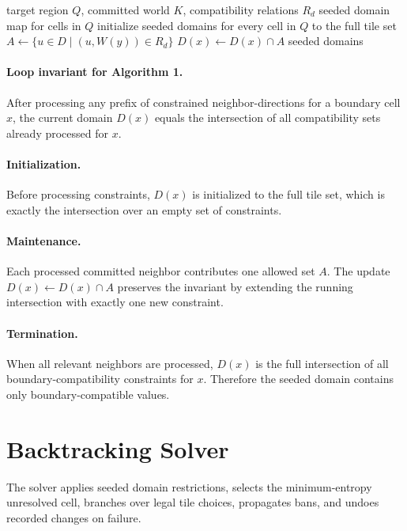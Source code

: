 \documentclass[12pt,a4paper]{report}
\begin{document}
\begin{algorithm}[H]
\caption{Boundary Seeding by Propagator Restriction}
\begin{algorithmic}[1]
\Require target region $Q$, committed world $K$, compatibility relations $R_d$
\Ensure seeded domain map for cells in $Q$
\State initialize seeded domains for every cell in $Q$ to the full tile set
    \State $A \gets \{u \in D \mid (u, W(y)) \in R_d\}$
    \State $D(x) \gets D(x) \cap A$
  \EndFor
\EndFor
\State \Return seeded domains
\end{algorithmic}
\end{algorithm}

\paragraph{Loop invariant for Algorithm 1.}
After processing any prefix of constrained neighbor-directions for a boundary cell $x$, the current domain $D(x)$ equals the intersection of all compatibility sets already processed for $x$.

\paragraph{Initialization.}
Before processing constraints, $D(x)$ is initialized to the full tile set, which is exactly the intersection over an empty set of constraints.

\paragraph{Maintenance.}
Each processed committed neighbor contributes one allowed set $A$. The update $D(x) \leftarrow D(x) \cap A$ preserves the invariant by extending the running intersection with exactly one new constraint.

\paragraph{Termination.}
When all relevant neighbors are processed, $D(x)$ is the full intersection of all boundary-compatibility constraints for $x$. Therefore the seeded domain contains only boundary-compatible values.

\section{Backtracking Solver}
The solver applies seeded domain restrictions, selects the minimum-entropy unresolved cell, branches over legal tile choices, propagates bans, and undoes recorded changes on failure.
\end{document}
